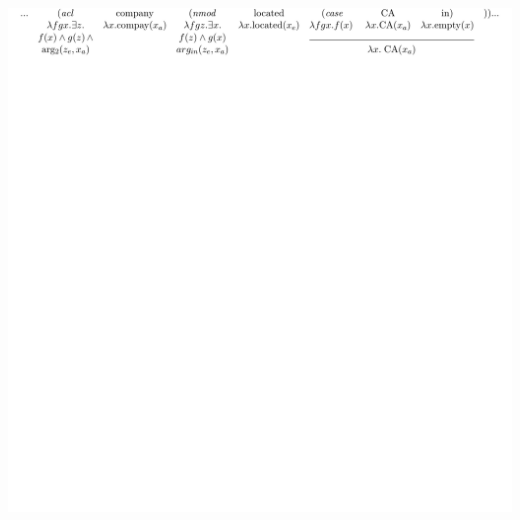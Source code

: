 \documentclass[mathserif,12pt]{beamer}
\begin{document}
{\begin{frame}
\begin{center}
{\includegraphics[trim=30.6em 45em 6em 3em,clip=true,scale=0.9]{figures/dependency-reduced-relative-derivation-ud}\vspace{2em}}

\end{center}
\end{frame}}
\end{document}
